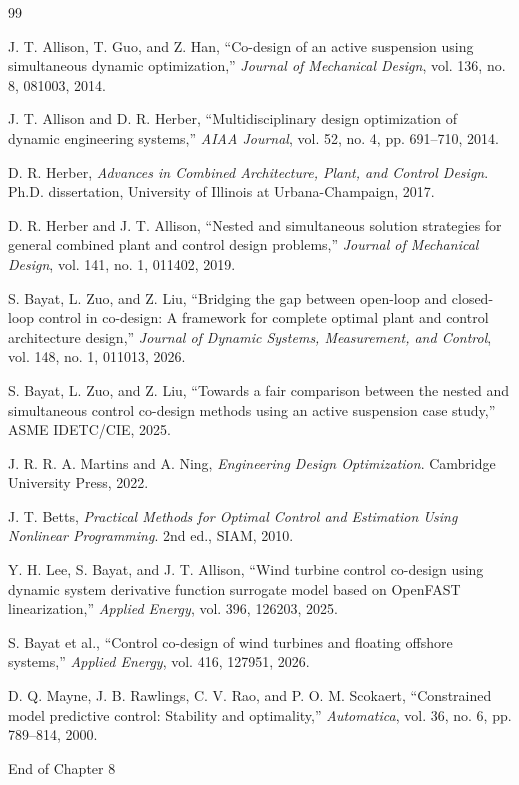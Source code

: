 \documentclass[11pt]{article}
\begin{document}
\begin{thebibliography}{99}

J. T. Allison, T. Guo, and Z. Han, ``Co-design of an active suspension using simultaneous dynamic optimization,'' \emph{Journal of Mechanical Design}, vol. 136, no. 8, 081003, 2014.

J. T. Allison and D. R. Herber, ``Multidisciplinary design optimization of dynamic engineering systems,'' \emph{AIAA Journal}, vol. 52, no. 4, pp. 691--710, 2014.

D. R. Herber, \emph{Advances in Combined Architecture, Plant, and Control Design}. Ph.D. dissertation, University of Illinois at Urbana-Champaign, 2017.

D. R. Herber and J. T. Allison, ``Nested and simultaneous solution strategies for general combined plant and control design problems,'' \emph{Journal of Mechanical Design}, vol. 141, no. 1, 011402, 2019.

S. Bayat, L. Zuo, and Z. Liu, ``Bridging the gap between open-loop and closed-loop control in co-design: A framework for complete optimal plant and control architecture design,'' \emph{Journal of Dynamic Systems, Measurement, and Control}, vol. 148, no. 1, 011013, 2026.

S. Bayat, L. Zuo, and Z. Liu, ``Towards a fair comparison between the nested and simultaneous control co-design methods using an active suspension case study,'' ASME IDETC/CIE, 2025.

J. R. R. A. Martins and A. Ning, \emph{Engineering Design Optimization}. Cambridge University Press, 2022.

J. T. Betts, \emph{Practical Methods for Optimal Control and Estimation Using Nonlinear Programming}. 2nd ed., SIAM, 2010.

Y. H. Lee, S. Bayat, and J. T. Allison, ``Wind turbine control co-design using dynamic system derivative function surrogate model based on OpenFAST linearization,'' \emph{Applied Energy}, vol. 396, 126203, 2025.

S. Bayat et al., ``Control co-design of wind turbines and floating offshore systems,'' \emph{Applied Energy}, vol. 416, 127951, 2026.

D. Q. Mayne, J. B. Rawlings, C. V. Rao, and P. O. M. Scokaert, ``Constrained model predictive control: Stability and optimality,'' \emph{Automatica}, vol. 36, no. 6, pp. 789--814, 2000.

\end{thebibliography}

\vfill
\begin{center}
\small\color{CCDgray}
End of Chapter 8
\end{center}
\end{document}
